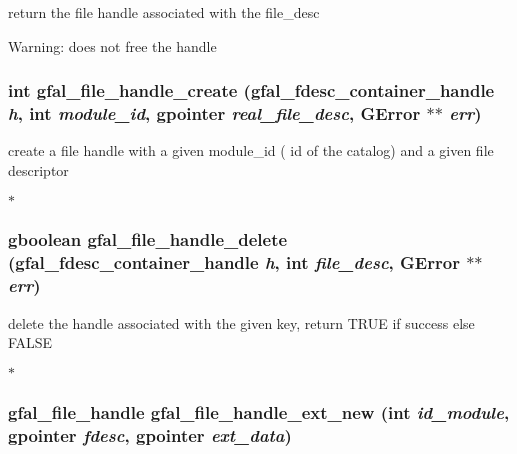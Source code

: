 return the file handle associated with the file\_\-desc \begin{Desc}
\item[Warning:]does not free the handle \end{Desc}
\subsubsection{\setlength{\rightskip}{0pt plus 5cm}int gfal\_\-file\_\-handle\_\-create (gfal\_\-fdesc\_\-container\_\-handle {\em h}, int {\em module\_\-id}, gpointer {\em real\_\-file\_\-desc}, GError $\ast$$\ast$ {\em err})}\label{gfal__common__filedescriptor_8c_9cfac852697441bd0289e9900960854c}


create a file handle with a given module\_\-id ( id of the catalog) and a given file descriptor

$\ast$ 
\subsubsection{\setlength{\rightskip}{0pt plus 5cm}gboolean gfal\_\-file\_\-handle\_\-delete (gfal\_\-fdesc\_\-container\_\-handle {\em h}, int {\em file\_\-desc}, GError $\ast$$\ast$ {\em err})}\label{gfal__common__filedescriptor_8c_5434be84154718254a4e90dbcc196359}


delete the handle associated with the given key, return TRUE if success else FALSE

$\ast$ 
\subsubsection{\setlength{\rightskip}{0pt plus 5cm}gfal\_\-file\_\-handle gfal\_\-file\_\-handle\_\-ext\_\-new (int {\em id\_\-module}, gpointer {\em fdesc}, gpointer {\em ext\_\-data})}\label{gfal__common__filedescriptor_8c_b2ae28c9bade093c2f1fea46f549fbee}


